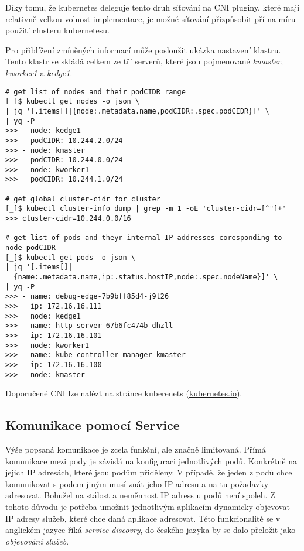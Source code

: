 Díky tomu, že kubernetes deleguje tento druh síťování na CNI pluginy, které mají relativně velkou volnost implementace, je možné síťování přizpůsobit pří na míru použití clusteru kubernetesu.

Pro přiblížení zmíněných informací může posloužit ukázka nastavení klastru. Tento klastr se skládá celkem ze tří serverů, které jsou pojmenované \textit{kmaster}, \textit{kworker1} a \textit{kedge1}.
\cite{vasilatos_2019_kubectl}
\begin{verbatim}
# get list of nodes and their podCIDR range
[_]$ kubectl get nodes -o json \ 
| jq '[.items[]|{node:.metadata.name,podCIDR:.spec.podCIDR}]' \
| yq -P
>>> - node: kedge1
>>>   podCIDR: 10.244.2.0/24
>>> - node: kmaster
>>>   podCIDR: 10.244.0.0/24
>>> - node: kworker1
>>>   podCIDR: 10.244.1.0/24

# get global cluster-cidr for cluster
[_]$ kubectl cluster-info dump | grep -m 1 -oE 'cluster-cidr=[^"]+'
>>> cluster-cidr=10.244.0.0/16

# get list of pods and theyr internal IP addresses coresponding to node podCIDR  
[_]$ kubectl get pods -o json \
| jq '[.items[]|
  {name:.metadata.name,ip:.status.hostIP,node:.spec.nodeName}]' \
| yq -P
>>> - name: debug-edge-7b9bff85d4-j9t26
>>>   ip: 172.16.16.111
>>>   node: kedge1
>>> - name: http-server-67b6fc474b-dhzll
>>>   ip: 172.16.16.101
>>>   node: kworker1
>>> - name: kube-controller-manager-kmaster
>>>   ip: 172.16.16.100
>>>   node: kmaster

\end{verbatim}



\cite{a2022_cluster} 
Doporučené CNI lze nalézt na stránce kuberenets (\href{https://kubernetes.io/docs/concepts/cluster-administration/addons/#networking-and-network-policy}{kubernetes.io}).

\subsection{Komunikace pomocí Service}
Výše popsaná komunikace je zcela funkční, ale značně limitovaná. Přímá komunikace mezi pody je závislá na konfiguraci jednotlivých podů. Konkrétně na jejich IP adresách, které jsou podům přiděleny. V případě, že jeden z podů chce komunikovat s podem jiným musí znát jeho IP adresu a na tu požadavky adresovat. Bohužel na stálost a neměnnost IP adress u podů není spoleh. Z tohoto důvodu je potřeba umožnit jednotlivým aplikacím dynamicky objevovat IP adresy služeb, které chce daná aplikace adresovat. Této funkcionalitě se v anglickém jazyce říká \textit{service discovry}, do českého jazyka by se dalo přeložit jako \textit{objevování služeb}. 


